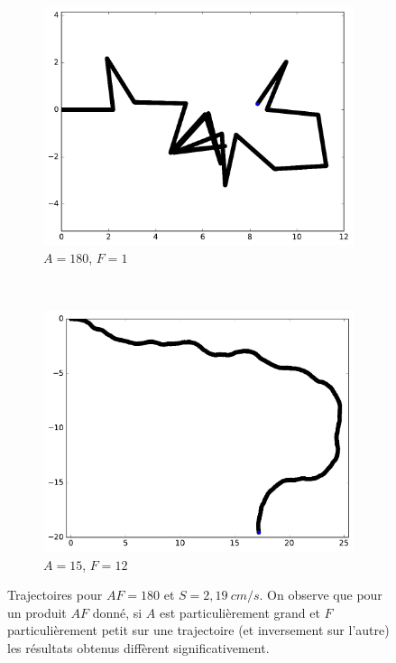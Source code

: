 	\begin{figure}[H]
		\centering
		\begin{subfigure}[t]{0.35\textwidth}
			\centering
			\includegraphics[width=\textwidth]{figures/ch3/synTraj_219_180_1}
			\caption[$A = 180$, $F=1$]{$A = 180$, $F=1$}
			\label{fig:synTraj_219_180_1b}
		\end{subfigure}
		~
		\begin{subfigure}[t]{0.35\textwidth}
			\centering
			\includegraphics[width=\textwidth]{figures/ch3/synTraj_219_15_12}
			\caption[$A = 15$, $F=12$]{$A = 15$, $F=12$}
			\label{fig:synTraj_219_15_12}
		\end{subfigure}
		\caption[Trajectoires pour $AF = 180$]{Trajectoires pour $AF = 180$ et $S = 2,19~cm/s$. On observe que pour un produit $AF$ donné, si $A$ est particulièrement grand et $F$ particulièrement petit sur une trajectoire (et inversement sur l'autre) les résultats obtenus diffèrent significativement.}
		\label{fig:trajsAF180}
	\end{figure}
	
